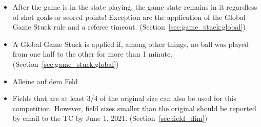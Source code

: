 \begin{itemize}
	\item After the game is in the state playing, the game state remains in it regardless of shot goals or scored points! Exception are the application of the Global Game Stuck rule and a referee timeout. (\cf Section~\ref{sec:game_stuck:global})
	
	\item A Global Game Stuck is applied if, among other things, no ball was played from one half to the other for more than 1 minute. (\cf Section~\ref{sec:game_stuck:global})
		
	\item Alleine auf dem Feld	
		
	\item Fields that are at least 3/4 of the original size can also be used for this competition. However, field sizes smaller than the original should be reported by email to the TC by June 1, 2021. (\cf Section~\ref{sec:field_dim})
\end{itemize}


